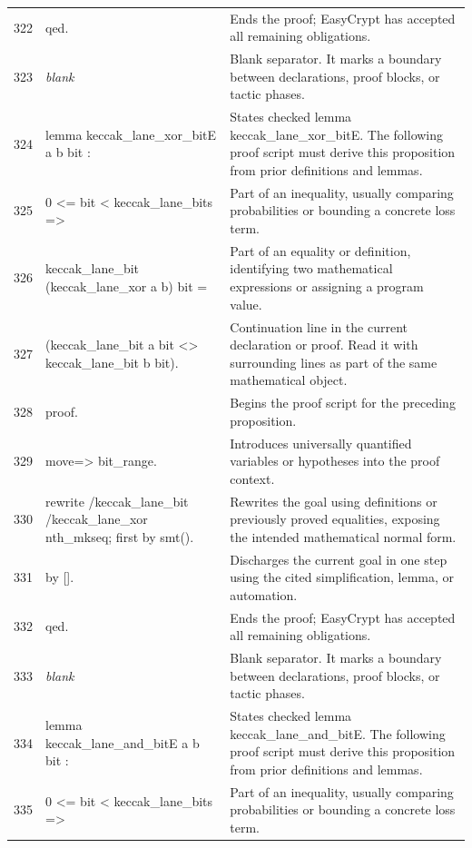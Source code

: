 \documentclass[10pt]{article}
\begin{document}
\begin{longtable}{r L{0.53\textwidth} L{0.37\textwidth}}
322 & {\ttfamily\scriptsize qed.} & Ends the proof; EasyCrypt has accepted all remaining obligations. \\
323 & {\ttfamily\scriptsize \emph{blank}} & Blank separator.  It marks a boundary between declarations, proof blocks, or tactic phases. \\
324 & {\ttfamily\scriptsize lemma keccak\_lane\_xor\_bitE a b bit :} & States checked lemma keccak\_lane\_xor\_bitE.  The following proof script must derive this proposition from prior definitions and lemmas. \\
325 & {\ttfamily\scriptsize   0 <= bit < keccak\_lane\_bits =>} & Part of an inequality, usually comparing probabilities or bounding a concrete loss term. \\
326 & {\ttfamily\scriptsize   keccak\_lane\_bit (keccak\_lane\_xor a b) bit =} & Part of an equality or definition, identifying two mathematical expressions or assigning a program value. \\
327 & {\ttfamily\scriptsize   (keccak\_lane\_bit a bit <> keccak\_lane\_bit b bit).} & Continuation line in the current declaration or proof.  Read it with surrounding lines as part of the same mathematical object. \\
328 & {\ttfamily\scriptsize proof.} & Begins the proof script for the preceding proposition. \\
329 & {\ttfamily\scriptsize move=> bit\_range.} & Introduces universally quantified variables or hypotheses into the proof context. \\
330 & {\ttfamily\scriptsize rewrite /keccak\_lane\_bit /keccak\_lane\_xor nth\_mkseq; first by smt().} & Rewrites the goal using definitions or previously proved equalities, exposing the intended mathematical normal form. \\
331 & {\ttfamily\scriptsize by [].} & Discharges the current goal in one step using the cited simplification, lemma, or automation. \\
332 & {\ttfamily\scriptsize qed.} & Ends the proof; EasyCrypt has accepted all remaining obligations. \\
333 & {\ttfamily\scriptsize \emph{blank}} & Blank separator.  It marks a boundary between declarations, proof blocks, or tactic phases. \\
334 & {\ttfamily\scriptsize lemma keccak\_lane\_and\_bitE a b bit :} & States checked lemma keccak\_lane\_and\_bitE.  The following proof script must derive this proposition from prior definitions and lemmas. \\
335 & {\ttfamily\scriptsize   0 <= bit < keccak\_lane\_bits =>} & Part of an inequality, usually comparing probabilities or bounding a concrete loss term. \\

\end{longtable}
\end{document}
